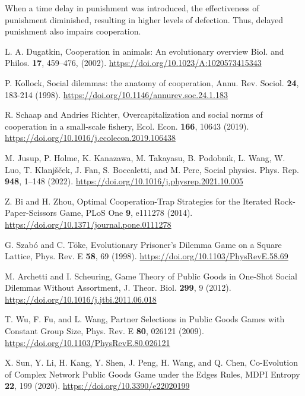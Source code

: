When a time delay in punishment was introduced, the effectiveness of punishment diminished, resulting in higher levels of defection. Thus, delayed punishment also impairs cooperation. 





\begin{thebibliography}{04}

L. A. Dugatkin,
Cooperation in animals: An evolutionary overview
Biol. and Philos. \textbf{17}, 459–476, (2002).
\url{https://doi.org/10.1023/A:1020573415343}

P. Kollock, Social dilemmas: the anatomy of cooperation,
Annu. Rev. Sociol. \textbf{24}, 183-214 (1998).
\url{https://doi.org/10.1146/annurev.soc.24.1.183}

R. Schaap and Andries Richter,
Overcapitalization and social norms of cooperation in a small-scale fishery,
Ecol. Econ. \textbf{166}, 10643 (2019).
\url{https://doi.org/10.1016/j.ecolecon.2019.106438}

\raggedright
M. Jusup, P. Holme, K. Kanazawa,  M. Takayasu, B. Podobnik, L. Wang,  W. Luo, T. Klanjšček, J. Fan,  S. Boccaletti, and M. Perc,
Social physics.
Phys. Rep. \textbf{948}, 1--148 (2022). 
\url{https://doi.org/10.1016/j.physrep.2021.10.005}

Z. Bi and H. Zhou, Optimal Cooperation-Trap Strategies for the Iterated Rock-Paper-Scissors Game, PLoS One \textbf{9}, e111278 (2014). \url{https://doi.org/10.1371/journal.pone.0111278}

G. Szabó and C. Töke, Evolutionary Prisoner’s Dilemma Game on a Square Lattice, Phys. Rev. E \textbf{58}, 69 (1998). \url{https://doi.org/10.1103/PhysRevE.58.69}

M. Archetti and I. Scheuring, Game Theory of Public Goods in One-Shot Social Dilemmas Without Assortment, J. Theor. Biol. \textbf{299}, 9 (2012). \url{https://doi.org/10.1016/j.jtbi.2011.06.018}

T. Wu, F. Fu, and L. Wang, Partner Selections in Public Goods Games with Constant Group Size, Phys. Rev. E \textbf{80}, 026121 (2009). \url{https://doi.org/10.1103/PhysRevE.80.026121}

X. Sun, Y. Li, H. Kang, Y. Shen, J. Peng, H. Wang, and Q. Chen, Co-Evolution of Complex Network Public Goods Game under the Edges Rules, MDPI Entropy \textbf{22}, 199 (2020). \url{https://doi.org/10.3390/e22020199}




\end{thebibliography}
